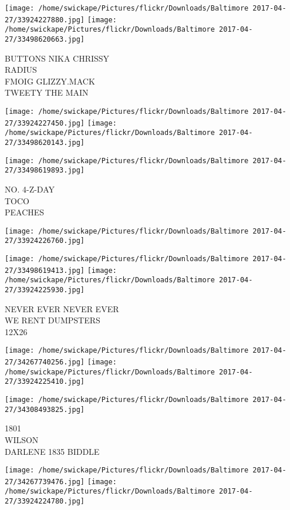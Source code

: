 \documentclass[10pt,letterpaper]{article}
\begin{document}
\texttt{[image: /home/swickape/Pictures/flickr/Downloads/Baltimore 2017-04-27/33924227880.jpg]}
\texttt{[image: /home/swickape/Pictures/flickr/Downloads/Baltimore 2017-04-27/33498620663.jpg]}

BUTTONS NIKA CHRISSY\\
RADIUS\\
FMOIG GLIZZY.MACK\\
TWEETY THE MAIN\\
\pagebreak

\texttt{[image: /home/swickape/Pictures/flickr/Downloads/Baltimore 2017-04-27/33924227450.jpg]}
\texttt{[image: /home/swickape/Pictures/flickr/Downloads/Baltimore 2017-04-27/33498620143.jpg]}

\texttt{[image: /home/swickape/Pictures/flickr/Downloads/Baltimore 2017-04-27/33498619893.jpg]}

NO. 4{-}Z{-}DAY\\
TOCO\\
PEACHES\\
\pagebreak

\texttt{[image: /home/swickape/Pictures/flickr/Downloads/Baltimore 2017-04-27/33924226760.jpg]}

\vspace{0.25in}
\texttt{[image: /home/swickape/Pictures/flickr/Downloads/Baltimore 2017-04-27/33498619413.jpg]}
\texttt{[image: /home/swickape/Pictures/flickr/Downloads/Baltimore 2017-04-27/33924225930.jpg]}

NEVER EVER NEVER EVER\\
WE RENT DUMPSTERS\\
12X26\\
\pagebreak

\texttt{[image: /home/swickape/Pictures/flickr/Downloads/Baltimore 2017-04-27/34267740256.jpg]}
\texttt{[image: /home/swickape/Pictures/flickr/Downloads/Baltimore 2017-04-27/33924225410.jpg]}

\vspace{0.25in}
\texttt{[image: /home/swickape/Pictures/flickr/Downloads/Baltimore 2017-04-27/34308493825.jpg]}

1801\\
WILSON\\
DARLENE 1835 BIDDLE\\
\pagebreak

\texttt{[image: /home/swickape/Pictures/flickr/Downloads/Baltimore 2017-04-27/34267739476.jpg]}
\texttt{[image: /home/swickape/Pictures/flickr/Downloads/Baltimore 2017-04-27/33924224780.jpg]}
\end{document}
